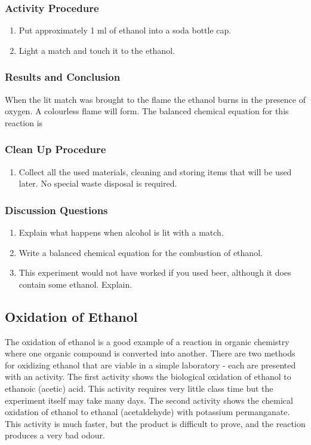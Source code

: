 \subsubsection*{Activity Procedure}
\begin{enumerate}
\item{Put approximately 1 ml of ethanol into a soda bottle cap.}
\item{Light a match and touch it to the ethanol.}
\end{enumerate}

\subsubsection*{Results and Conclusion}
When the lit match was brought to the flame the ethanol burns in the presence of oxygen. A colourless flame will form. The balanced chemical equation for this reaction is


\subsubsection*{Clean Up Procedure}
\begin{enumerate}
\item{Collect all the used materials, cleaning and storing items that will be used later. No special waste disposal is required.}
\end{enumerate}

\subsubsection*{Discussion Questions}
\begin{enumerate}
\item{Explain what happens when alcohol is lit with a match.}
\item{Write a balanced chemical equation for the combustion of ethanol.}
\item{This experiment would not have worked if you used beer, although it does contain some ethanol. Explain.}
\end{enumerate}

\subsection{Oxidation of Ethanol}

The oxidation of ethanol is a good example of a reaction in organic chemistry where one organic compound is converted into another. There are two methods for oxidizing ethanol that are viable in a simple laboratory - each are presented with an activity. The first activity shows the biological oxidation of ethanol to ethanoic (acetic) acid. This activity requires very little class time but the experiment itself may take many days. The second activity shows the chemical oxidation of ethanol to ethanal (acetaldehyde) with potassium permanganate. This activity is much faster, but the product is difficult to prove, and the reaction produces a very bad odour.

